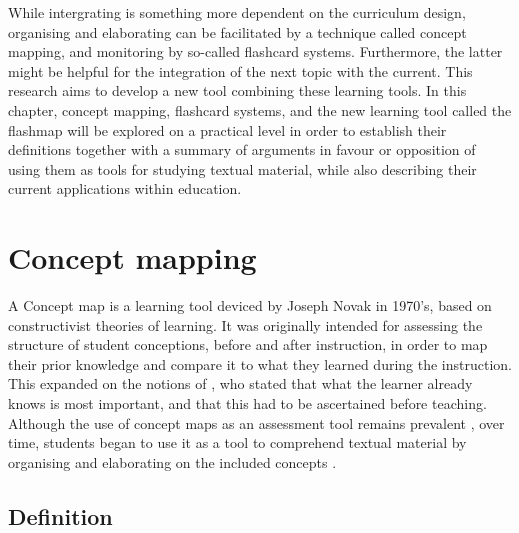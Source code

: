 While intergrating is something more dependent on the curriculum design, organising and elaborating can be facilitated by a technique called concept mapping, and monitoring by so-called flashcard systems. Furthermore, the latter might be helpful for the integration of the next topic with the current. This research aims to develop a new tool combining these learning tools. In this chapter, concept mapping, flashcard systems, and the new learning tool called the flashmap will be explored on a practical level in order to establish their definitions together with a summary of arguments in favour or opposition of using them as tools for studying textual material, while also describing their current applications within education.

\section{Concept mapping}

A Concept map is a learning tool deviced by Joseph Novak in 1970's, based on constructivist theories of learning. It was originally intended for assessing the structure of student conceptions, before and after instruction, in order to map their prior knowledge and compare it to what they learned during the instruction. This expanded on the notions of , who stated that what the learner already knows is most important, and that this had to be ascertained before teaching. Although the use of concept maps as an assessment tool remains prevalent \cite{canas, chung, hwang2, ruiz1}, over time, students began to use it as a tool to comprehend textual material by organising and elaborating on the included concepts \cite{canas, eppler, hwang2, karpicke2, nesbit}.

\subsection{Definition}

